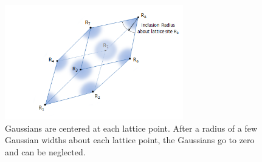 \documentclass[double,12pt]{beavtex}
\begin{document}
\begin{figure}
   \centering
   \includegraphics[height=5cm]{InclusionRadius.png}
   \caption{Gaussians are centered at each lattice point. After a radius 
   of a few Gaussian widths about each lattice point, the Gaussians go to 
   zero and can be neglected.}
   \label{fig:InclusionRadius}
\end{figure} 
\end{document}
